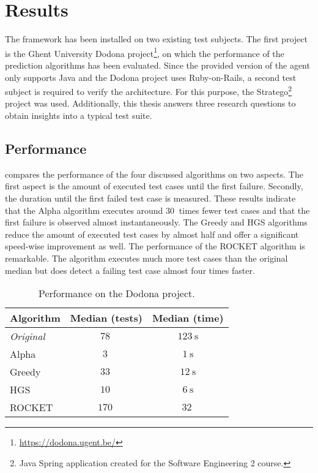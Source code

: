 \section{Results}
\noindent The framework has been installed on two existing test subjects. The first project is the Ghent University Dodona project\footnote{\url{https://dodona.ugent.be/}}, on which the performance of the prediction algorithms has been evaluated. Since the provided version of the agent only supports Java and the Dodona project uses Ruby-on-Rails, a second test subject is required to verify the architecture. For this purpose, the Stratego\footnote{Java Spring application created for the Software Engineering 2 course.} project was used. Additionally, this thesis answers three research questions to obtain insights into a typical test suite.

\subsection{Performance}
\noindent {} compares the performance of the four discussed algorithms on two aspects. The first aspect is the amount of executed test cases until the first failure. Secondly, the duration until the first failed test case is measured. These results indicate that the Alpha algorithm executes around $\SI{30}{}$ times fewer test cases and that the first failure is observed almost instantaneously. The Greedy and HGS algorithms reduce the amount of executed test cases by almost half and offer a significant speed-wise improvement as well. The performance of the ROCKET algorithm is remarkable. The algorithm executes much more test cases than the original median but does detect a failing test case almost four times faster.

\begin{table}[h]
	\centering
	\begin{tabularx}{\columnwidth}{|X||c|c|}
		\hline
		\textbf{Algorithm} & \textbf{Median (tests)} & \textbf{Median (time)}\\
		\hline
		\emph{Original} & $\SI{78}{}$ & $\SI{123}{\second}$\\
		
		\hline
		
		Alpha & $\SI{3}{}$ & $\SI{1}{\second}$\\
		
		Greedy & $\SI{33}{}$ & $\SI{12}{\second}$\\
		
		HGS & $\SI{10}{}$ & $\SI{6}{\second}$\\
		
		ROCKET & $\SI{170}{}$ & $\SI{32}{}$\\
		
		\hline
	\end{tabularx}
	\caption{Performance on the Dodona project.}
	\label{tbl:performance-dodona}
\end{table}

